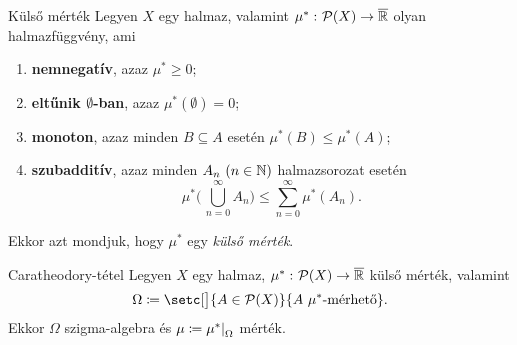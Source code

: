 \documentclass[
]{elteikthesis}[2024/04/26]
\begin{document}
	\begin{definition}{Külső mérték}{}
		Legyen \( X \) egy halmaz, 
		valamint \( \mu^* \,\colon  \mathcal{P}( X )  \to  \overline{\mathbb{R}} \) olyan halmazfüggvény, ami
			\begin{enumerate}
			\item 
			\textbf{nemnegatív}, azaz \( \mu^* \geq 0 \);
			
			\item 
			\textbf{eltűnik \( \boldsymbol{\emptyset} \)-ban}, azaz
			\( \mu^*(\emptyset) = 0 \);
			
			\item 
			\textbf{monoton}, 
			azaz minden \( B \subseteq A \) esetén \( \mu^*(B) \leq \mu^*(A) \);
			
			\item
			\textbf{szubadditív}, 
			azaz minden \( A_n \ (n \in \mathbb{N} ) \) halmazsorozat esetén
			\[
				\mu^* \Biggl( \, \bigcup\limits_{n=0}^\infty A_n \Biggr) \leq 
				\sum\limits_{n=0}^{\infty} \mu^*(A_n).
			\]
		\end{enumerate}
		Ekkor azt mondjuk, hogy \( \mu^* \) egy \emph{külső mérték}.
	\end{definition}
	
	\begin{theorem}{Caratheodory-tétel}{}
		Legyen \( X \) egy halmaz, 
		\( \mu^* \,\colon  \mathcal{P}( X )  \to  \overline{\mathbb{R}} \) külső mérték, valamint
		\[
			\Omega \coloneq \setc[\big]{ A \in \powerset{X} }{ A \ \mu^* \text{-mérhető} }.
		\]
		Ekkor \( \Omega \) szigma-algebra és \( \mu \coloneq \restr{\mu^*}{\Omega} \) mérték.
	\end{theorem}
	
\end{document}
